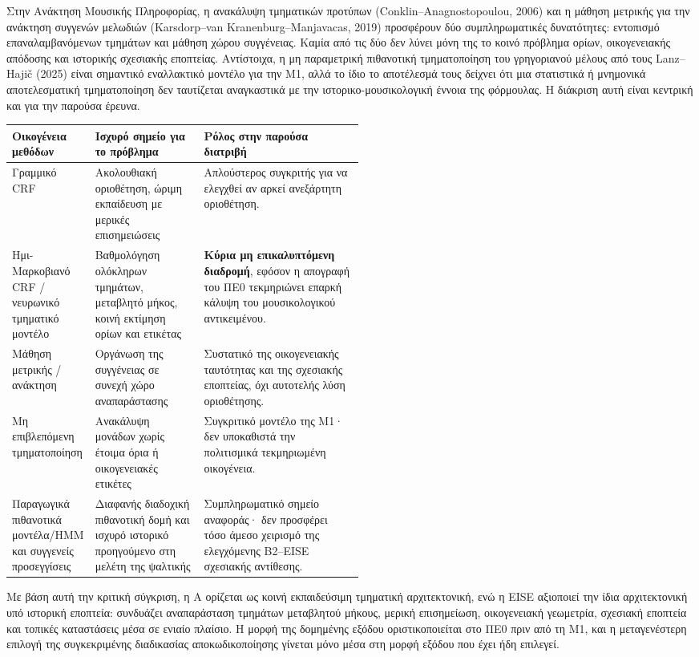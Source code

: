\documentclass[11pt,a4paper]{article}
\begin{document}
Στην Ανάκτηση Μουσικής Πληροφορίας, η ανακάλυψη τμηματικών προτύπων (Conklin--Anagnostopoulou, 2006) και η μάθηση μετρικής για την ανάκτηση συγγενών μελωδιών (Karsdorp--van Kranenburg--Manjavacas, 2019) προσφέρουν δύο συμπληρωματικές δυνατότητες: εντοπισμό επαναλαμβανόμενων τμημάτων και μάθηση χώρου συγγένειας. Καμία από τις δύο δεν λύνει μόνη της το κοινό πρόβλημα ορίων, οικογενειακής απόδοσης και ιστορικής σχεσιακής εποπτείας. Αντίστοιχα, η μη παραμετρική πιθανοτική τμηματοποίηση του γρηγοριανού μέλους από τους Lanz--Hajič (2025) είναι σημαντικό εναλλακτικό μοντέλο για την M1, αλλά το ίδιο το αποτέλεσμά τους δείχνει ότι μια στατιστικά ή μνημονικά αποτελεσματική τμηματοποίηση δεν ταυτίζεται αναγκαστικά με την ιστορικο-μουσικολογική έννοια της φόρμουλας. Η διάκριση αυτή είναι κεντρική και για την παρούσα έρευνα.

\begin{xltabular}{0.98\linewidth}{@{}p{0.20\linewidth}p{0.31\linewidth}Y@{}}
\toprule
\textbf{Οικογένεια μεθόδων} & \textbf{Ισχυρό σημείο για το πρόβλημα} & \textbf{Ρόλος στην παρούσα διατριβή}\\
\midrule
Γραμμικό CRF & Ακολουθιακή οριοθέτηση, ώριμη εκπαίδευση με μερικές επισημειώσεις & Απλούστερος συγκριτής για να ελεγχθεί αν αρκεί ανεξάρτητη οριοθέτηση.\\
\midrule
Ημι-Μαρκοβιανό CRF / νευρωνικό τμηματικό μοντέλο & Βαθμολόγηση ολόκληρων τμημάτων, μεταβλητό μήκος, κοινή εκτίμηση ορίων και ετικέτας & \textbf{Κύρια μη επικαλυπτόμενη διαδρομή}, εφόσον η απογραφή του ΠΕ0 τεκμηριώνει επαρκή κάλυψη του μουσικολογικού αντικειμένου.\\
\midrule
Μάθηση μετρικής / ανάκτηση & Οργάνωση της συγγένειας σε συνεχή χώρο αναπαράστασης & Συστατικό της οικογενειακής ταυτότητας και της σχεσιακής εποπτείας, όχι αυτοτελής λύση οριοθέτησης.\\
\midrule
Μη επιβλεπόμενη τμηματοποίηση & Ανακάλυψη μονάδων χωρίς έτοιμα όρια ή οικογενειακές ετικέτες & Συγκριτικό μοντέλο της M1· δεν υποκαθιστά την πολιτισμικά τεκμηριωμένη οικογένεια.\\
\midrule
Παραγωγικά πιθανοτικά μοντέλα/HMM και συγγενείς προσεγγίσεις & Διαφανής διαδοχική πιθανοτική δομή και ισχυρό ιστορικό προηγούμενο στη μελέτη της ψαλτικής & Συμπληρωματικό σημείο αναφοράς· δεν προσφέρει τόσο άμεσο χειρισμό της ελεγχόμενης B2--EISE σχεσιακής αντίθεσης.\\
\bottomrule
\end{xltabular}

Με βάση αυτή την κριτική σύγκριση, η A ορίζεται ως κοινή εκπαιδεύσιμη τμηματική αρχιτεκτονική, ενώ η EISE αξιοποιεί την ίδια αρχιτεκτονική υπό ιστορική εποπτεία: συνδυάζει αναπαράσταση τμημάτων μεταβλητού μήκους, μερική επισημείωση, οικογενειακή γεωμετρία, σχεσιακή εποπτεία και τοπικές καταστάσεις μέσα σε ενιαίο πλαίσιο. Η μορφή της δομημένης εξόδου οριστικοποιείται στο ΠΕ0 πριν από τη M1, και η μεταγενέστερη επιλογή της συγκεκριμένης διαδικασίας αποκωδικοποίησης γίνεται μόνο μέσα στη μορφή εξόδου που έχει ήδη επιλεγεί.
\end{document}

